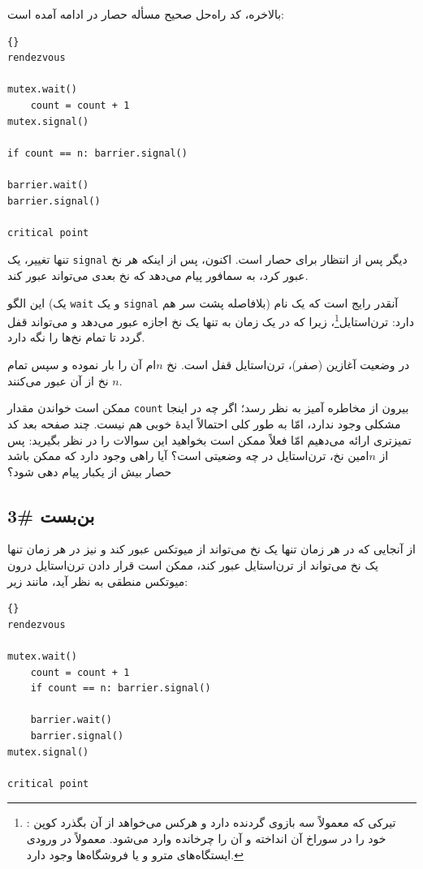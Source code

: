 \documentclass{book}
\newcommand{\clearemptydoublepage}{}%
\begin{document}
    بالاخره، کد راه‌حل صحیح مسأله حصار در ادامه آمده است:	

\begin{latin}
\begin{lstlisting}[title=\rl{راه‌حل حصار}]{}
rendezvous

mutex.wait()
    count = count + 1
mutex.signal()

if count == n: barrier.signal()

barrier.wait()
barrier.signal()

critical point
\end{lstlisting}
\end{latin}

    تنها تغییر، یک \texttt{signal} دیگر پس از انتظار برای حصار است. 
    اکنون، پس از اینکه هر نخ عبور کرد، به سمافور پیام می‌دهد که نخ بعدی می‌تواند عبور کند. 


    این الگو (یک \texttt{wait} و یک \texttt{signal} بلافاصله پشت سر هم) آنقدر رایج است که یک نام دارد: ترن‌استایل\footnote{%
    : 
    تیرکی که معمولاً سه بازوی گردنده دارد و هرکس می‌خواهد از آن بگذرد کوپن خود را در سوراخ آن انداخته و آن‌ را چرخانده وارد می‌شود. 
    معمولاً در ورودی ایستگاه‌های مترو و یا فروشگاه‌ها وجود دارد.}، 
    زیرا که در یک زمان به تنها یک نخ اجازه عبور می‌دهد و می‌تواند قفل گردد تا تمام نخ‌ها را نگه دارد. 
    
    در وضعیت آغازین (صفر)، ترن‌استایل قفل است. نخ  $n$ام آن را بار نموده و سپس تمام  $n$ نخ از آن عبور می‌کنند. 

    ممکن است خواندن مقدار \texttt{count} بیرون از  مخاطره‌ آمیز به نظر رسد؛ اگر چه در اینجا مشکلی وجود ندارد،
    امّا به طور کلی احتمالاً ایدهٔ خوبی هم نیست. چند صفحه بعد کد تمیزتری ارائه می‌دهیم امّا فعلاً ممکن است بخواهید این سوالات را در نظر بگیرید:
    پس از $n$امین نخ، ترن‌استایل در چه وضعیتی است؟ آیا راهی وجود دارد که ممکن باشد حصار بیش از یکبار پیام دهی شود؟

\clearemptydoublepage
\subsection {بن‌بست \#3}

    از آنجایی که در هر زمان تنها یک نخ می‌تواند از میوتکس عبور کند و نیز در هر زمان تنها یک نخ می‌تواند از ترن‌استایل عبور کند، 
    ممکن است قرار دادن ترن‌استایل درون میوتکس منطقی به نظر آید، مانند زیر: 
\begin{latin}
\begin{lstlisting}[title=\rl{راه‌حل بدِ حصار}]{}
rendezvous

mutex.wait()
    count = count + 1
    if count == n: barrier.signal()

    barrier.wait()
    barrier.signal()
mutex.signal()

critical point
\end{lstlisting}
\end{latin}
\end{document}
